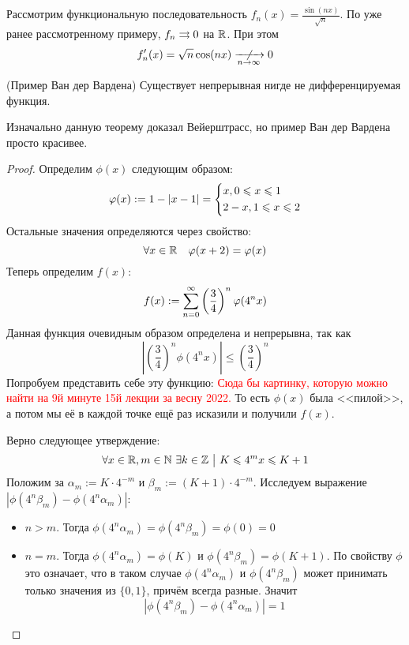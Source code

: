 \begin{example}
	Рассмотрим функциональную последовательность $f_n(x) = \frac{\sin (nx)}{\sqrt{n}}$. По уже ранее рассмотренному примеру, $f_n \rightrightarrows 0$ на $\mathbb{R}$. При этом
	\[
		f'_n(x) = \sqrt{n} \cos (nx) \centernot{\xrightarrow[n \to \infty]{}} 0
	\]
\end{example}

\begin{theorem} (Пример Ван дер Вардена)
	Существует непрерывная нигде не дифференцируемая функция.
\end{theorem}

\begin{note}
	Изначально данную теорему доказал Вейерштрасс, но пример Ван дер Вардена просто красивее.
\end{note}

\begin{proof}
	Определим $\phi(x)$ следующим образом:
	\[
		\varphi(x) := 1 - |x - 1| = \left\{\begin{aligned}
			&{x, 0 \leqslant x \leqslant 1}
			\\
			&{2 - x, 1 \leqslant x \leqslant 2}
		\end{aligned}\right.
	\]
	Остальные значения определяются через свойство:
	\[
		\forall x \in \mathbb{R} \quad \varphi(x + 2) = \varphi(x)
	\]
	Теперь определим $f(x)$:
	\[
		f(x) := \sum_{n = 0}^\infty \left(\frac{3}{4}\right)^n \varphi(4^n x)
	\]
	Данная функция очевидным образом определена и непрерывна, так как
	\[
		\left|\left(\frac{3}{4}\right)^n \phi(4^n x)\right| \le \left(\frac{3}{4}\right)^n
	\]
	Попробуем представить себе эту функцию:
	\textcolor{red}{Сюда бы картинку, которую можно найти на 9й минуте 15й лекции за весну 2022.}
	То есть $\phi(x)$ была <<пилой>>, а потом мы её в каждой точке ещё раз исказили и получили $f(x)$.
	
	Верно следующее утверждение:
	\[
		\forall x \in \mathbb{R}, m \in \mathbb{N}\ \exists k \in \mathbb{Z} \ \big|\  K \leqslant 4^m x \leqslant K + 1
	\]
	Положим за $\alpha_m := K \cdot 4^{-m}$ и $\beta_m := (K + 1) \cdot 4^{-m}$. Исследуем выражение $|\phi(4^n\beta_m) - \phi(4^n\alpha_m)|$:
	\begin{itemize}
		\item $n > m$. Тогда $\phi(4^n \alpha_m) = \phi(4^n \beta_m) = \phi(0) = 0$
		
		\item $n = m$. Тогда $\phi(4^n \alpha_m) = \phi(K)$ и $\phi(4^n \beta_m) = \phi(K + 1)$. По свойству $\phi$ это означает, что в таком случае $\phi(4^n \alpha_m)$ и $\phi(4^n \beta_m)$ может принимать только значения из $\{0, 1\}$, причём всегда разные. Значит
		\[
			|\phi(4^n \beta_m) - \phi(4^n \alpha_m)| = 1
		\]
		

\end{itemize}
\end{proof}

